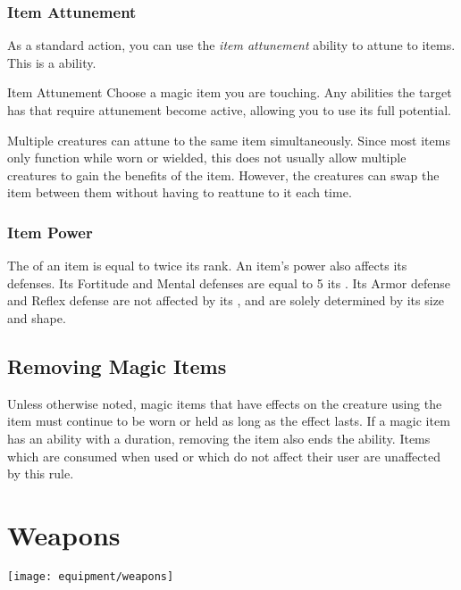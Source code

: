         \subsubsection{Item Attunement}\label{Item Attunement}

            As a standard action, you can use the \textit{item attunement} ability to attune to items.
            This is a \magical ability.

            \begin{attuneability}{Item Attunement}{}
                \rankline
                Choose a magic item you are touching.
                Any abilities the target has that require attunement become active, allowing you to use its full potential.
            \end{attuneability}

             Multiple creatures can attune to the same item simultaneously.
            Since most items only function while worn or wielded, this does not usually allow multiple creatures to gain the benefits of the item.
            However, the creatures can swap the item between them without having to reattune to it each time.

    \subsubsection{Item Power}\label{Item Power}
        The  of an item is equal to twice its rank.
        An item's power also affects its defenses.
        Its Fortitude and Mental defenses are equal to 5 \add its .
        Its Armor defense and Reflex defense are not affected by its , and are solely determined by its size and shape.

    \subsection{Removing Magic Items}
        Unless otherwise noted, magic items that have effects on the creature using the item must continue to be worn or held as long as the effect lasts.
        If a magic item has an ability with a duration, removing the item also ends the ability.
        Items which are consumed when used or which do not affect their user are unaffected by this rule.

\newpage
\section{Weapons}\label{Weapons}
    \texttt{[image: equipment/weapons]}

